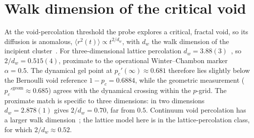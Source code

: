 \documentclass[aps,prl,twocolumn,superscriptaddress,floatfix,nofootinbib,longbibliography]{revtex4-2}
\newcommand{\msd}{\langle r^2(t)\rangle}
\newcommand{\pc}{p_c}
\newcommand{\pcp}{p_c'}
\begin{document}
\section{Walk dimension of the critical void}
\label{app:dw}
At the void-percolation threshold the probe explores a critical, fractal void,
so its diffusion is anomalous, $\msd\propto t^{2/d_w}$, with $d_w$ the walk
dimension of the incipient cluster~\cite{Gefen1983,Havlin1983,Straley1980,Argyrakis1985}.
For three-dimensional lattice percolation $d_w=3.88(3)$~\cite{Kammerer2008}, so
$2/d_w=0.515(4)$, proximate to the operational Winter--Chambon marker
$\alpha=0.5$. The dynamical gel point at $\pcp(\infty)\approx0.681$ therefore
lies slightly below the Bernoulli void reference $1-\pc=0.6884$, while the
geometric measurement ($\pcp^{\mathrm{geom}}\approx0.685$) agrees with the
dynamical crossing within the $p$-grid. The proximate match is specific to
three dimensions: in two dimensions $d_w=2.878(1)$ gives $2/d_w=0.70$, far
from $0.5$. Continuum void percolation has a larger walk dimension~\cite{Kammerer2008}; the
lattice model here is in the lattice-percolation class, for which
$2/d_w\approx0.52$.
\end{document}
